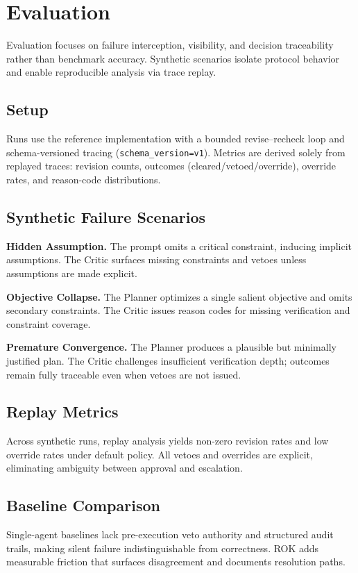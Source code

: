 \section{Evaluation}

Evaluation focuses on failure interception, visibility, and decision traceability rather than benchmark accuracy. Synthetic scenarios isolate protocol behavior and enable reproducible analysis via trace replay.

\subsection{Setup}
Runs use the reference implementation with a bounded revise–recheck loop and schema-versioned tracing (\texttt{schema\_version=v1}). Metrics are derived solely from replayed traces: revision counts, outcomes (cleared/vetoed/override), override rates, and reason-code distributions.

\subsection{Synthetic Failure Scenarios}
\textbf{Hidden Assumption.} The prompt omits a critical constraint, inducing implicit assumptions. The Critic surfaces missing constraints and vetoes unless assumptions are made explicit.

\textbf{Objective Collapse.} The Planner optimizes a single salient objective and omits secondary constraints. The Critic issues reason codes for missing verification and constraint coverage.

\textbf{Premature Convergence.} The Planner produces a plausible but minimally justified plan. The Critic challenges insufficient verification depth; outcomes remain fully traceable even when vetoes are not issued.

\subsection{Replay Metrics}
Across synthetic runs, replay analysis yields non-zero revision rates and low override rates under default policy. All vetoes and overrides are explicit, eliminating ambiguity between approval and escalation.

\subsection{Baseline Comparison}
Single-agent baselines lack pre-execution veto authority and structured audit trails, making silent failure indistinguishable from correctness. ROK adds measurable friction that surfaces disagreement and documents resolution paths.

